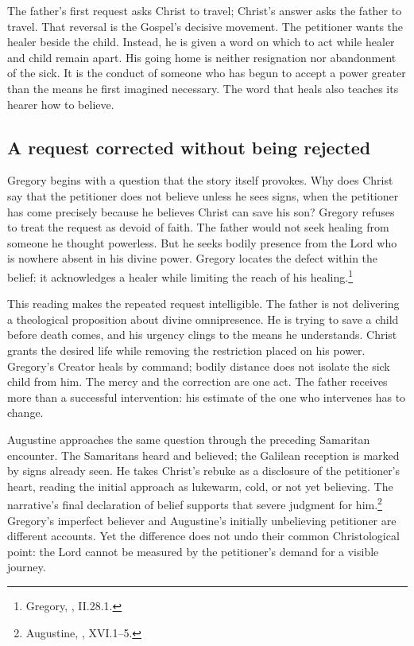 
The father's first request asks Christ to travel; Christ's answer asks the
father to travel. That reversal is the Gospel's decisive movement. The
petitioner wants the healer beside the child. Instead, he is given a word
on which to act while healer and child remain apart. His going home is
neither resignation nor abandonment of the sick. It is the conduct of
someone who has begun to accept a power greater than the means he first
imagined necessary. The word that heals also teaches its hearer how to
believe.

\subsection{A request corrected without being rejected}
Gregory begins with a question that the story itself provokes. Why does
Christ say that the petitioner does not believe unless he sees signs,
when the petitioner has come precisely because he believes Christ can
save his son? Gregory refuses to treat the request as devoid of faith.
The father would not seek healing from someone he thought powerless.
But he seeks bodily presence from the Lord who is nowhere absent in his
divine power. Gregory locates the defect within the belief: it acknowledges
a healer while limiting the reach of his healing.\footnote{Gregory,
, II.28.1.}

This reading makes the repeated request intelligible. The father is not
delivering a theological proposition about divine omnipresence. He is
trying to save a child before death comes, and his urgency clings to the
means he understands. Christ grants the desired life while removing the
restriction placed on his power. Gregory's Creator heals by command;
bodily distance does not isolate the sick child from him. The mercy and
the correction are one act. The father receives more than a successful
intervention: his estimate of the one who intervenes has to change.

Augustine approaches the same question through the preceding Samaritan
encounter. The Samaritans heard and believed; the Galilean reception is
marked by signs already seen. He takes Christ's rebuke as a disclosure
of the petitioner's heart, reading the initial approach as lukewarm,
cold, or not yet believing. The narrative's final declaration of belief
supports that severe judgment for him.\footnote{Augustine,
, XVI.1--5.}
Gregory's imperfect believer and Augustine's initially unbelieving
petitioner are different accounts. Yet the difference does not undo
their common Christological point: the Lord cannot be measured by the
petitioner's demand for a visible journey.

